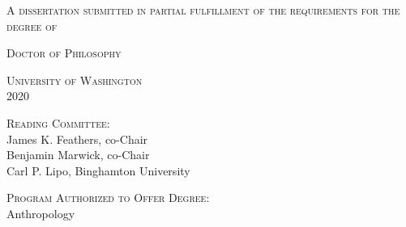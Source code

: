

\begin{titlingpage}
\begin{center}\leavevmode

    \normalfont
    \vfill

    {\Large \textsc{\thesisTitle}\par}
    
    \vfill
    
    {\Large \thesisAuthor\par}%

	\vfill
    
    {\large \textsc{A dissertation
submitted in partial fulfillment of the
requirements for the degree of}}

    \vfill

    {\large \textsc{Doctor of Philosophy}}
    
\vfill

    
    {\large \textsc{University of Washington\\ 2020}}

	\vfill
	
	{\large \textsc{Reading Committee:}\\
	James K. Feathers, co-Chair\\
    Benjamin Marwick, co-Chair\\ 
    Carl P. Lipo, Binghamton University\\}
	
	\vfill
	
	{\large \textsc{Program Authorized to Offer Degree:}\\
	Anthropology\\}
	
	

\end{center}%
\end{titlingpage}
